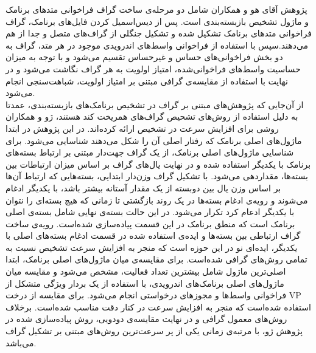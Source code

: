 پژوهش آقای هو و همکاران شامل دو مرحله‌ی ساخت گراف فراخوانی متد‌های‌ برنامک و ماژول تشخیص بازبسته‌بندی است. پس از دیس‌اسمیل کردن فایل‌های برنامک، گراف فراخوانی متد‌های برنامک تشکیل شده و تشکیل جنگلی از گراف‌های متصل و جدا از هم می‌دهند.سپس با استفاده از فراخوانی‌ واسط‌های اندرویدی موجود در هر متد، گراف به دو بخش فراخوانی‌های حساس‌ و غیرحساس‌ تقسیم می‌شود و با توجه به میزان حساسیت واسط‌های فراخوانی‌شده، امتیاز اولویت‌ به هر گراف نگاشت می‌شود و در نهایت با استفاده از مقایسه‌ی گرافی مبتنی بر امتیاز اولویت، شباهت‌سنجی انجام می‌شود.\\

از آن‌جایی که پژوهش‌های مبتنی بر گراف در تشخیص برنامک‌های بازبسته‌بندی، عمدتا به دلیل استفاده از روش‌های تشحیص گراف‌های همریخت کند هستند، ژو و همکاران  روشی برای افزایش سرعت در تشخیص ارائه کرده‌اند. در این پژوهش در ابتدا ماژول‌های اصلی برنامک که رفتار اصلی آن را شکل می‌دهند شناسایی می‌شود. برای شناسایی ماژول‌های اصلی برنامک، از یک گراف جهت‌دار مبتنی بر ارتباط بسته‌‌های برنامک با یکدیگر استفاده شده و در نهایت یال‌های گراف بر اساس میزان ارتباطات بین بسته‌ها، مقدار‌دهی می‌شود. با تشکیل گراف وزن‌دار ابتدایی، بسته‌هایی که ارتباط آن‌ها بر اساس وزن یال بین دو‌بسته از یک مقدار آستانه بیشتر باشد، با یکدیگر ادغام می‌شوند و رویه‌ی ادغام بسته‌ها در یک روند بازگشتی تا زمانی که هیچ بسته‌ای را نتوان با یکدیگر ادعام کرد تکرار می‌شود. در این حالت بسته‌ی نهایی شامل بسته‌ی اصلی برنامک است که منطق برنامک در این قسمت پیاده‌سازی شده‌است. رویه‌ی ساخت گراف ارتباطی بین بسته‌‌ها و ایده‌ی استفاده شده در قسمت ادغام بسته‌های اصلی با یکدیگر، ایده‌ای نو در این حوزه‌ است که منجر به افزایش سرعت تشخیص نسبت به تمامی روش‌های گرافی شده‌است. برای مقایسه‌ی میان ماژول‌های اصلی برنامک، ابتدا اصلی‌ترین ماژول شامل بیشترین تعداد فعالیت، مشخص می‌شود و مقایسه میان ماژول‌های اصلی برنامک‌های اندرویدی،‌ با استفاده از یک بردار ویژگی متشکل از فراخوانی‌ واسط‌ها و مجوز‌های‌ درخواستی انجام می‌شود. برای مقایسه از درخت VP‌ استفاده شده‌است که منجر به افزایش سرعت در کنار دقت مناسب شده‌است. برخلاف روش‌های معمول گرافی و در نهایت مقایسه‌ی دو‌دویی، روش پیاده‌سازی شده در پژوهش ژو، با مرتبه‌ی زمانی  یکی از پر سرعت‌ترین روش‌های مبتنی بر تشکیل گراف می‌باشد.\\
